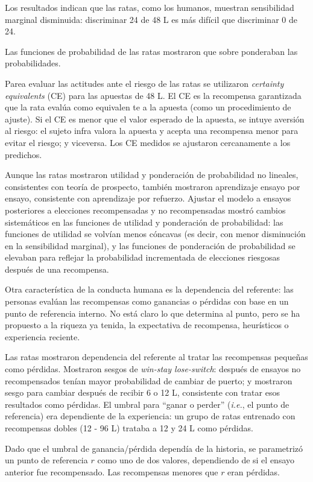 \documentclass[a4paper,12pt]{article}
\begin{document}
Los resultados indican que las ratas, como los humanos, muestran sensibilidad marginal disminuida: discriminar 24 de 48 \textmu L es más difícil que discriminar 0 de 24.

Las funciones de probabilidad de las ratas mostraron que sobre ponderaban las probabilidades.

Parea evaluar las actitudes ante el riesgo de las ratas se utilizaron {\itshape certainty equivalents} (CE) para las apuestas de 48 \textmu L.
El CE es la recompensa garantizada que la rata evalúa como equivalen te a la apuesta (como un procedimiento de ajuste).
Si el CE es menor que el valor esperado de la apuesta, se intuye aversión al riesgo: el sujeto infra valora la apuesta y acepta una recompensa menor para evitar el riesgo; y viceversa.
Los CE medidos se ajustaron cercanamente a los predichos.

Aunque las ratas mostraron utilidad y ponderación de probabilidad no lineales, consistentes con teoría de prospecto, también mostraron aprendizaje ensayo por ensayo, consistente con aprendizaje por refuerzo.
Ajustar el modelo a ensayos posteriores a elecciones recompensadas y no recompensadas mostró cambios sistemáticos en las funciones de utilidad y ponderación de probabilidad: las funciones de utilidad se volvían menos cóncavas (es decir, con menor disminución en la sensibilidad marginal), y las funciones de ponderación de probabilidad se elevaban para reflejar la probabilidad incrementada de elecciones riesgosas después de una recompensa.

Otra característica de la conducta humana es la dependencia del referente: las personas evalúan las recompensas como ganancias o pérdidas con base en un punto de referencia interno.
No está claro lo que determina al punto, pero se ha propuesto a la riqueza ya tenida, la expectativa de recompensa, heurísticos o experiencia reciente.

Las ratas mostraron dependencia del referente al tratar las recompensas pequeñas como pérdidas.
Mostraron sesgos de {\itshape win-stay lose-switch}: después de ensayos no recompensados tenían mayor probabilidad de cambiar de puerto; y mostraron sesgo para cambiar después de recibir 6 o 12 \textmu L, consistente con tratar esos resultados como pérdidas.
El umbral para ``ganar o perder'' ({\itshape i.e.}, el punto de referencia) era dependiente de la experiencia: un grupo de ratas entrenado con recompensas dobles (12 - 96 \textmu L) trataba a 12 y 24 \textmu L como pérdidas.

Dado que el umbral de ganancia/pérdida dependía de la historia, se parametrizó un punto de referencia $r$ como uno de dos valores, dependiendo de si el ensayo anterior fue recompensado.
Las recompensas menores que $r$ eran pérdidas.
\end{document}
